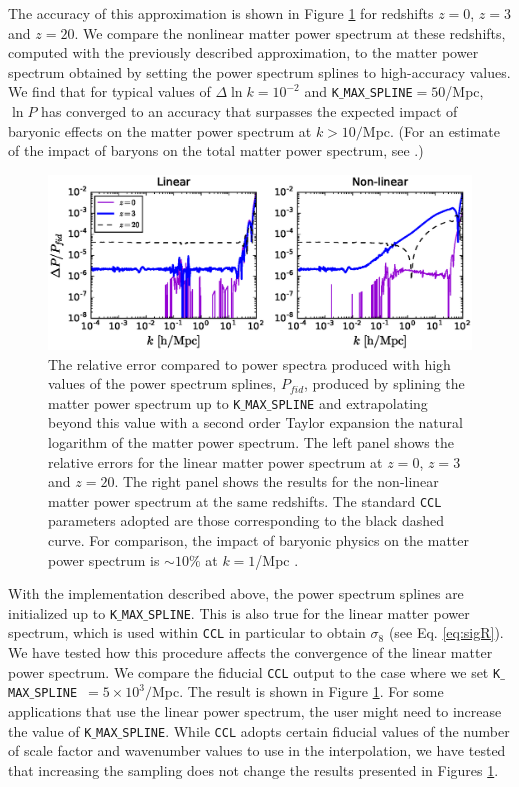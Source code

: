 \documentclass[\docopts]{\docclass}
\newcommand{\ccl}{{\tt CCL}\xspace}
\begin{document}
The accuracy of this approximation is shown in Figure \ref{fig:NLextrapol} for redshifts $z=0$, $z=3$ and $z=20$. We compare the nonlinear matter power spectrum at these redshifts, computed with the previously described approximation, to the matter power spectrum obtained by setting the power spectrum splines to high-accuracy values. We find that for typical values of $\Delta \ln k=10^{-2}$ and {\tt K$\_$MAX$\_$SPLINE}$=50$/Mpc, $\ln P$ has converged to an accuracy that surpasses the expected impact of baryonic effects on the matter power spectrum at $k>10/$Mpc.  (For an estimate of the impact of baryons on the total matter power spectrum, see \citealt{Schneider15}.) 

\begin{figure}
\centering
\includegraphics[width=1.0\textwidth]{plot_power.eps}
\caption{The relative error compared to power spectra produced with high values of the power spectrum splines, $P_{fid}$, produced by splining the matter power spectrum up to {\tt K$\_$MAX$\_$SPLINE} and extrapolating beyond this value with a second order Taylor expansion the natural logarithm of the matter power spectrum. The left panel shows the relative errors for the linear matter power spectrum at $z=0$, $z=3$ and $z=20$. The right panel shows the results for the non-linear matter power spectrum at the same redshifts. The standard \ccl parameters adopted are those corresponding to the black dashed curve. For comparison, the impact of baryonic physics on the matter power spectrum is $\sim 10\%$ at $k=1$/Mpc \citep{Schneider15}.}
\label{fig:NLextrapol}
\end{figure}

With the implementation described above, the power spectrum splines are initialized up to {\tt K$\_$MAX$\_$SPLINE}. This is also true for the linear matter power spectrum, which is used within \ccl in particular to obtain $\sigma_8$ (see Eq. \ref{eq:sigR}). We have tested how this procedure affects the convergence of the linear matter power spectrum. We compare the fiducial \ccl output to the case where we set {\tt K$\_$MAX$\_$SPLINE}~$=5\times 10^3/$Mpc. The result is shown in Figure \ref{fig:NLextrapol}. For some applications that use the linear power spectrum, the user might need to increase the value of {\tt K$\_$MAX$\_$SPLINE}. While \ccl adopts certain fiducial values of the number of scale factor and wavenumber values to use in the interpolation, we have tested that increasing the sampling does not change the results presented in Figures \ref{fig:NLextrapol}.
\end{document}
